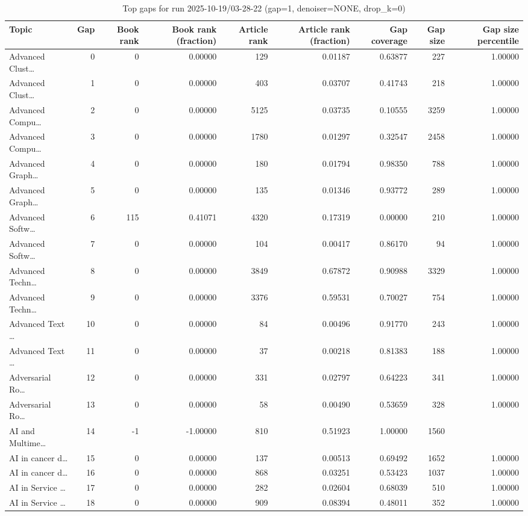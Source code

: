 \begin{table}
\caption{Top gaps for run 2025-10-19/03-28-22 (gap=1, denoiser=NONE, drop\_k=0)}
\label{tab:best_run_gap1_2025_10_19_03_28_22}
\begin{tabular}{lrrrrrrrr}
\toprule
Topic & Gap & Book rank & Book rank (fraction) & Article rank & Article rank (fraction) & Gap coverage & Gap size & Gap size percentile \\
\midrule
Advanced Clust… & 0 & 0 & 0.00000 & 129 & 0.01187 & 0.63877 & 227 & 1.00000 \\
Advanced Clust… & 1 & 0 & 0.00000 & 403 & 0.03707 & 0.41743 & 218 & 1.00000 \\
Advanced Compu… & 2 & 0 & 0.00000 & 5125 & 0.03735 & 0.10555 & 3259 & 1.00000 \\
Advanced Compu… & 3 & 0 & 0.00000 & 1780 & 0.01297 & 0.32547 & 2458 & 1.00000 \\
Advanced Graph… & 4 & 0 & 0.00000 & 180 & 0.01794 & 0.98350 & 788 & 1.00000 \\
Advanced Graph… & 5 & 0 & 0.00000 & 135 & 0.01346 & 0.93772 & 289 & 1.00000 \\
Advanced Softw… & 6 & 115 & 0.41071 & 4320 & 0.17319 & 0.00000 & 210 & 1.00000 \\
Advanced Softw… & 7 & 0 & 0.00000 & 104 & 0.00417 & 0.86170 & 94 & 1.00000 \\
Advanced Techn… & 8 & 0 & 0.00000 & 3849 & 0.67872 & 0.90988 & 3329 & 1.00000 \\
Advanced Techn… & 9 & 0 & 0.00000 & 3376 & 0.59531 & 0.70027 & 754 & 1.00000 \\
Advanced Text … & 10 & 0 & 0.00000 & 84 & 0.00496 & 0.91770 & 243 & 1.00000 \\
Advanced Text … & 11 & 0 & 0.00000 & 37 & 0.00218 & 0.81383 & 188 & 1.00000 \\
Adversarial Ro… & 12 & 0 & 0.00000 & 331 & 0.02797 & 0.64223 & 341 & 1.00000 \\
Adversarial Ro… & 13 & 0 & 0.00000 & 58 & 0.00490 & 0.53659 & 328 & 1.00000 \\
AI and Multime… & 14 & -1 & -1.00000 & 810 & 0.51923 & 1.00000 & 1560 &  \\
AI in cancer d… & 15 & 0 & 0.00000 & 137 & 0.00513 & 0.69492 & 1652 & 1.00000 \\
AI in cancer d… & 16 & 0 & 0.00000 & 868 & 0.03251 & 0.53423 & 1037 & 1.00000 \\
AI in Service … & 17 & 0 & 0.00000 & 282 & 0.02604 & 0.68039 & 510 & 1.00000 \\
AI in Service … & 18 & 0 & 0.00000 & 909 & 0.08394 & 0.48011 & 352 & 1.00000 \\

\end{tabular}
\end{table}
